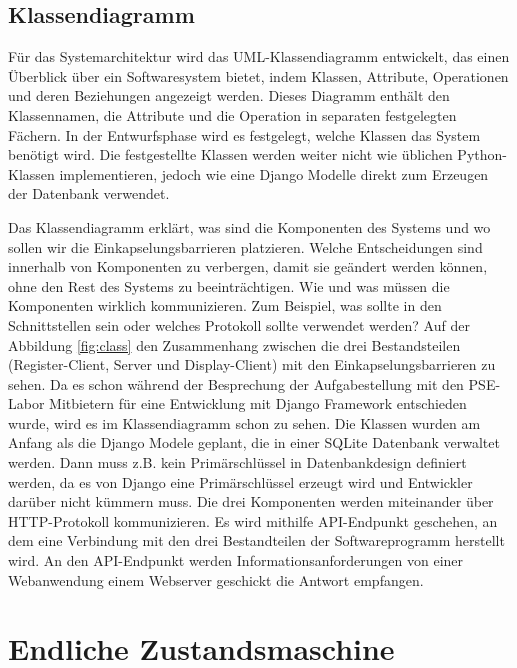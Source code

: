 \subsection{Klassendiagramm}
\label{sec:design:uml:class}
Für das Systemarchitektur wird das UML-Klassendiagramm entwickelt, das einen Überblick über ein Softwaresystem bietet, indem Klassen, Attribute, Operationen und deren Beziehungen angezeigt werden. Dieses Diagramm enthält den Klassennamen, die Attribute und die Operation in separaten festgelegten Fächern\cite{website:19}. In der Entwurfsphase wird es festgelegt, welche Klassen das System benötigt wird. Die festgestellte Klassen werden weiter nicht wie üblichen Python-Klassen implementieren, jedoch wie eine Django Modelle direkt zum Erzeugen der Datenbank verwendet. 

  

 Das Klassendiagramm erklärt, was sind die Komponenten des Systems und wo sollen wir die Einkapselungsbarrieren platzieren. Welche Entscheidungen sind innerhalb von Komponenten zu verbergen, damit sie geändert werden können, ohne den Rest des Systems zu beeinträchtigen. Wie und was müssen die Komponenten wirklich kommunizieren. Zum Beispiel, was sollte in den Schnittstellen sein oder welches Protokoll sollte verwendet werden? Auf der Abbildung \ref{fig:class} den Zusammenhang zwischen die drei Bestandsteilen (Register-Client, Server und Display-Client) mit den Einkapselungsbarrieren zu sehen. Da es schon während der Besprechung der Aufgabestellung mit den PSE-Labor Mitbietern für eine Entwicklung mit Django Framework entschieden wurde, wird es im Klassendiagramm schon zu sehen. Die Klassen wurden am Anfang als die Django Modele geplant, die in einer SQLite Datenbank verwaltet werden. Dann muss z.B. kein Primärschlüssel in Datenbankdesign definiert werden, da es von Django eine Primärschlüssel erzeugt wird und Entwickler darüber nicht kümmern muss. Die drei Komponenten werden miteinander über HTTP-Protokoll kommunizieren. Es wird mithilfe API-Endpunkt geschehen, an dem eine Verbindung mit den drei Bestandteilen der Softwareprogramm herstellt wird. An den API-Endpunkt werden Informationsanforderungen von einer Webanwendung einem Webserver geschickt die Antwort empfangen.

\section{Endliche Zustandsmaschine}
\label{sec:design:fsm}
